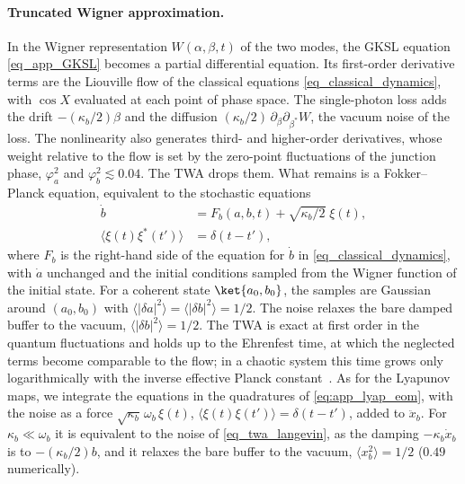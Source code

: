 \paragraph*{Truncated Wigner approximation.}
In the Wigner representation $W(\alpha,\beta,t)$ of the two modes, the GKSL equation \cref{eq_app_GKSL} becomes a partial differential equation. Its first-order derivative terms are the Liouville flow of the classical equations \cref{eq_classical_dynamics}, with $\cos X$ evaluated at each point of phase space. The single-photon loss adds the drift $-(\kappa_b/2)\beta$ and the diffusion $(\kappa_b/2)\,\partial_\beta\partial_{\beta^*}W$, the vacuum noise of the loss. The nonlinearity also generates third- and higher-order derivatives, whose weight relative to the flow is set by the zero-point fluctuations of the junction phase, $\varphi_a^2$ and $\varphi_b^2\lesssim0.04$. The TWA drops them. What remains is a Fokker--Planck equation, equivalent to the stochastic equations
\begin{equation}
\begin{split}
    \dot b &= F_b(a,b,t)+\sqrt{\kappa_b/2}\;\xi(t),\\
    \langle\xi(t)\xi^*(t')\rangle &= \delta(t-t'),
\end{split}
\label{eq_twa_langevin}
\end{equation}
where $F_b$ is the right-hand side of the equation for $\dot b$ in \cref{eq_classical_dynamics}, with $\dot a$ unchanged and the initial conditions sampled from the Wigner function of the initial state. For a coherent state $\ket{a_0,b_0}$, the samples are Gaussian around $(a_0,b_0)$ with $\langle|\delta a|^2\rangle=\langle|\delta b|^2\rangle=1/2$. The noise relaxes the bare damped buffer to the vacuum, $\langle|\delta b|^2\rangle=1/2$. The TWA is exact at first order in the quantum fluctuations and holds up to the Ehrenfest time, at which the neglected terms become comparable to the flow; in a chaotic system this time grows only logarithmically with the inverse effective Planck constant~\cite{Polkovnikov2010Sep}. As for the Lyapunov maps, we integrate the equations in the quadratures of \cref{eq:app_lyap_eom}, with the noise as a force $\sqrt{\kappa_b}\,\omega_b\,\xi(t)$, $\langle\xi(t)\xi(t')\rangle=\delta(t-t')$, added to $\ddot x_b$. For $\kappa_b\ll\omega_b$ it is equivalent to the noise of \cref{eq_twa_langevin}, as the damping $-\kappa_b\dot x_b$ is to $-(\kappa_b/2)b$, and it relaxes the bare buffer to the vacuum, $\langle x_b^2\rangle=1/2$ ($0.49$ numerically).

